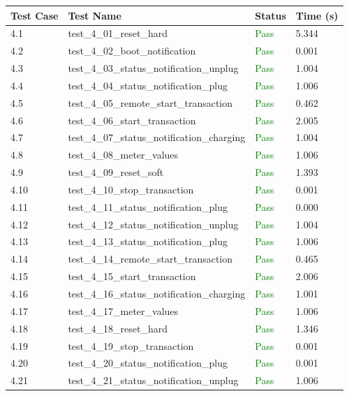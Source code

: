 \documentclass{article}
\begin{document}
\begin{longtable}{p{} p{} p{} p{}}
\toprule
\textbf{Test Case} & \textbf{Test Name} & \textbf{Status} & \textbf{Time (s)} \\
\midrule
\endhead
4.1 & test\_4\_01\_reset\_hard & \textcolor{green}{Pass} & 5.344 \\
4.2 & test\_4\_02\_boot\_notification & \textcolor{green}{Pass} & 0.001 \\
4.3 & test\_4\_03\_status\_notification\_unplug & \textcolor{green}{Pass} & 1.004 \\
4.4 & test\_4\_04\_status\_notification\_plug & \textcolor{green}{Pass} & 1.006 \\
4.5 & test\_4\_05\_remote\_start\_transaction & \textcolor{green}{Pass} & 0.462 \\
4.6 & test\_4\_06\_start\_transaction & \textcolor{green}{Pass} & 2.005 \\
4.7 & test\_4\_07\_status\_notification\_charging & \textcolor{green}{Pass} & 1.004 \\
4.8 & test\_4\_08\_meter\_values & \textcolor{green}{Pass} & 1.006 \\
4.9 & test\_4\_09\_reset\_soft & \textcolor{green}{Pass} & 1.393 \\
4.10 & test\_4\_10\_stop\_transaction & \textcolor{green}{Pass} & 0.001 \\
4.11 & test\_4\_11\_status\_notification\_plug & \textcolor{green}{Pass} & 0.000 \\
4.12 & test\_4\_12\_status\_notification\_unplug & \textcolor{green}{Pass} & 1.004 \\
4.13 & test\_4\_13\_status\_notification\_plug & \textcolor{green}{Pass} & 1.006 \\
4.14 & test\_4\_14\_remote\_start\_transaction & \textcolor{green}{Pass} & 0.465 \\
4.15 & test\_4\_15\_start\_transaction & \textcolor{green}{Pass} & 2.006 \\
4.16 & test\_4\_16\_status\_notification\_charging & \textcolor{green}{Pass} & 1.001 \\
4.17 & test\_4\_17\_meter\_values & \textcolor{green}{Pass} & 1.006 \\
4.18 & test\_4\_18\_reset\_hard & \textcolor{green}{Pass} & 1.346 \\
4.19 & test\_4\_19\_stop\_transaction & \textcolor{green}{Pass} & 0.001 \\
4.20 & test\_4\_20\_status\_notification\_plug & \textcolor{green}{Pass} & 0.001 \\
4.21 & test\_4\_21\_status\_notification\_unplug & \textcolor{green}{Pass} & 1.006 \\
\bottomrule
\end{longtable}
\end{document}
